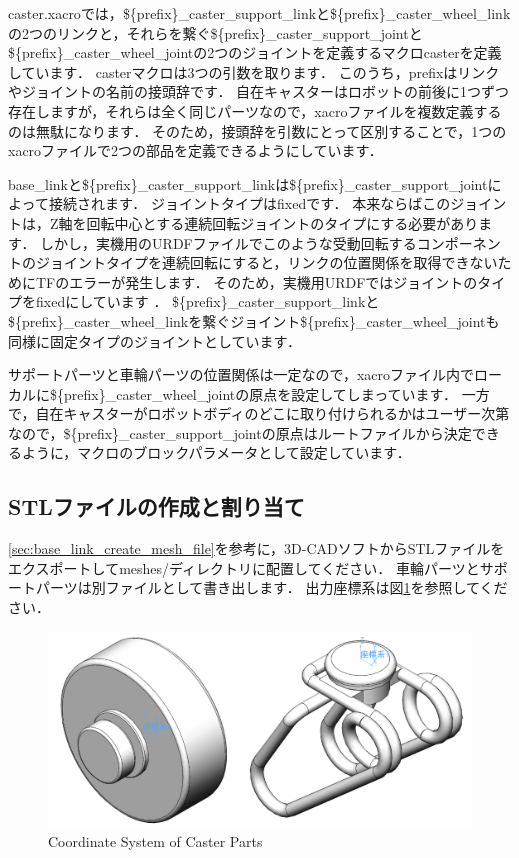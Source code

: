 \documentclass[{../../master}]{subfiles}
\begin{document}
\textsf{caster.xacro}では，\textsf{\$\{prefix\}\_caster\_support\_link}と\textsf{\$\{prefix\}\_caster\_wheel\_link}の2つのリンクと，それらを繋ぐ\textsf{\$\{prefix\}\_caster\_support\_joint}と\textsf{\$\{prefix\}\_caster\_wheel\_joint}の2つのジョイントを定義するマクロ\textsf{caster}を定義しています．
\textsf{caster}マクロは3つの引数を取ります．
このうち，\textsf{prefix}はリンクやジョイントの名前の接頭辞です．
自在キャスターはロボットの前後に1つずつ存在しますが，それらは全く同じパーツなので，xacroファイルを複数定義するのは無駄になります．
そのため，接頭辞を引数にとって区別することで，1つのxacroファイルで2つの部品を定義できるようにしています．

\textsf{base\_link}と\textsf{\$\{prefix\}\_caster\_support\_link}は\textsf{\$\{prefix\}\_caster\_support\_joint}によって接続されます．
ジョイントタイプは\textsf{fixed}です．
本来ならばこのジョイントは，Z軸を回転中心とする連続回転ジョイントのタイプにする必要があります．
しかし，実機用のURDFファイルでこのような受動回転するコンポーネントのジョイントタイプを連続回転にすると，リンクの位置関係を取得できないためにTFのエラーが発生します．
そのため，実機用URDFではジョイントのタイプを\textsf{fixed}にしています
．
\textsf{\$\{prefix\}\_caster\_support\_link}と\textsf{\$\{prefix\}\_caster\_wheel\_link}を繋ぐジョイント\textsf{\$\{prefix\}\_caster\_wheel\_joint}も同様に固定タイプのジョイントとしています．

サポートパーツと車輪パーツの位置関係は一定なので，xacroファイル内でローカルに\textsf{\$\{prefix\}\_caster\_wheel\_joint}の原点を設定してしまっています．
一方で，自在キャスターがロボットボディのどこに取り付けられるかはユーザー次第なので，\textsf{\$\{prefix\}\_caster\_support\_joint}の原点はルートファイルから決定できるように，マクロのブロックパラメータとして設定しています．

\subsection{STLファイルの作成と割り当て}

\ref{sec:base_link_create_mesh_file}を参考に，3D-CADソフトからSTLファイルをエクスポートして\textsf{meshes/}ディレクトリに配置してください．
車輪パーツとサポートパーツは別ファイルとして書き出します．
出力座標系は図\ref{fig:caster_link_coordinate}を参照してください．

\begin{figure}[ht]
  \centering
  \includegraphics[height=40truemm]{images/caster_link_coordinate.drawio.png}
  \caption{Coordinate System of Caster Parts}
  \label{fig:caster_link_coordinate}
\end{figure}
\end{document}
